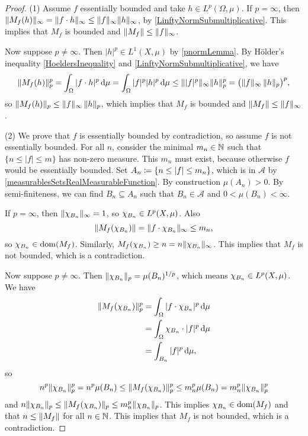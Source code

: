 \begin{proof}
(1) Assume $f$ essentially bounded and take $h\in L^p(\Omega,\mu)$. If $p = \infty$, then $\lVert M_f(h)\rVert_\infty = \lVert f\cdot h\rVert_\infty \leq \lVert f\rVert_\infty\lVert h\rVert_\infty$, by \ref{LinftyNormSubmultiplicative}. This implies that $M_f$ is bounded and $\lVert M_f\rVert \leq \lVert f\rVert_\infty$.

Now suppose $p\neq \infty$. Then $|h|^p \in L^1(X,\mu)$ by \ref{pnormLemma}. By Hölder's inequality \ref{HoeldersInequality} and \ref{LinftyNormSubmultiplicative}, we have
\[ \lVert M_f(h)\rVert_p^p = \int_\Omega |f\cdot h|^p \operatorname{d \!}{\mu} = \int_\Omega |f|^p|h|^p \operatorname{d \!}{\mu} \leq \lVert|f|^p\rVert_\infty \lVert h\rVert_p^p = \big(\lVert f\rVert_\infty\,\lVert h\rVert_p\big)^p, \]
so $\lVert M_f(h)\rVert_p \leq \lVert f\rVert_\infty\,\lVert h\rVert_p$, which implies that $M_f$ is bounded and $\lVert M_f\rVert \leq \lVert f\rVert_\infty$.

(2) We prove that $f$ is essentially bounded by contradiction, so assume $f$ is not essentially bounded. For all $n$, consider the minimal $m_n\in \mathbb{N}$ such that $\{n \leq |f| \leq m\}$ has non-zero measure. This $m_n$ must exist, because otherwise $f$ would be essentially bounded. Set $A_n \coloneqq \{n \leq |f| \leq m_n\}$, which is in $\mathcal{A}$ by \ref{measurablesSetsRealMeasurableFunction}. By construction $\mu(A_n) > 0$. By semi-finiteness, we can find $B_n\subseteq A_n$ such that $B_n\in \mathcal{A}$ and $0 < \mu(B_n)< \infty$.

If $p = \infty$, then $\lVert\chi_{B_n}\rVert_\infty = 1$, so $\chi_{B_n}\in L^p(X,\mu)$. Also
\[ \lVert M_f(\chi_{B_n})\rVert = \lVert f\cdot \chi_{B_n}\rVert_\infty \leq m_n, \]
so $\chi_{B_n} \in \operatorname{dom}(M_f)$. Similarly, $M_f(\chi_{B_n}) \geq n = n\lVert\chi_{B_n}\rVert_\infty$. This implies that $M_f$ is not bounded, which is a contradiction.

Now suppose $p \neq \infty$. Then $\lVert\chi_{B_n}\rVert_p = \mu(B_n)^{1/p}$, which means $\chi_{B_n}\in L^p(X, \mu)$. We have
\begin{align*}
\lVert M_f(\chi_{B_n})\rVert_p^p &= \int_\Omega |f\cdot \chi_{B_n}|^{p}\operatorname{d \!}{\mu} \\
&= \int_\Omega \chi_{B_n}\cdot|f|^p\operatorname{d \!}{\mu} \\
&= \int_{B_n}|f|^p\operatorname{d \!}{\mu},
\end{align*}
so
\[ n^p\lVert\chi_{B_n}\rVert_p^p = n^p\mu(B_n) \leq \lVert M_f(\chi_{B_n})\rVert_p^p \leq m_n^p\mu(B_n) = m_n^p\lVert\chi_{B_n}\rVert_p^p \]
and $n\lVert\chi_{B_n}\rVert_p \leq \lVert M_f(\chi_{B_n})\rVert_p \leq m_n^p\lVert\chi_{B_n}\rVert_p$. This implies $\chi_{B_n} \in \operatorname{dom}(M_f)$ and that $n \leq \lVert M_f\rVert$ for all $n\in \mathbb{N}$. This implies that $M_f$ is not bounded, which is a contradiction.


\end{proof}
